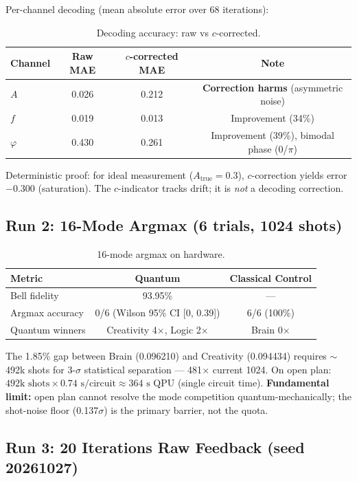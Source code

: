 \documentclass[sigconf,anonymous=false]{acmart}
\begin{document}
Per-channel decoding (mean absolute error over 68 iterations):

\begin{table}[h]
\centering
\caption{Decoding accuracy: raw vs $c$-corrected.}
\label{tab:decoding68}
\begin{tabular}{lccc}
\toprule
Channel & Raw MAE & $c$-corrected MAE & Note \\
\midrule
$A$ & 0.026 & 0.212 & \textbf{Correction harms} (asymmetric noise) \\
$f$ & 0.019 & 0.013 & Improvement (34\%) \\
$\varphi$ & 0.430 & 0.261 & Improvement (39\%), bimodal phase (0/$\pi$) \\
\bottomrule
\end{tabular}
\end{table}

Deterministic proof: for ideal measurement ($A_\text{true}=0.3$), $c$-correction yields error $-0.300$ (saturation). The $c$-indicator tracks drift; it is \emph{not} a decoding correction.

\subsection{Run 2: 16-Mode Argmax (6 trials, 1024 shots)}

\begin{table}[h]
\centering
\caption{16-mode argmax on hardware.}
\label{tab:16mode}
\begin{tabular}{lcc}
\toprule
Metric & Quantum & Classical Control \\
\midrule
Bell fidelity & 93.95\% & --- \\
Argmax accuracy & 0/6 (Wilson 95\% CI [0, 0.39]) & 6/6 (100\%) \\
Quantum winners & Creativity 4$\times$, Logic 2$\times$ & Brain 0$\times$ \\
\bottomrule
\end{tabular}
\end{table}

The 1.85\% gap between Brain (0.096210) and Creativity (0.094434) requires $\sim$492k shots for 3-$\sigma$ statistical separation --- 481$\times$ current 1024. On open plan: $492\text{k shots} \times 0.74\text{ s/circuit} \approx 364\text{ s QPU}$ (single circuit time). \textbf{Fundamental limit:} open plan cannot resolve the mode competition quantum-mechanically; the shot-noise floor (0.137$\sigma$) is the primary barrier, not the quota.

\subsection{Run 3: 20 Iterations Raw Feedback (seed 20261027)}
\end{document}
